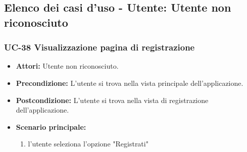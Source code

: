 \subsection{Elenco dei casi d'uso - Utente: Utente non riconosciuto}

\subsubsection{UC-38 Visualizzazione pagina di registrazione}
	\begin{itemize}
		\item \textbf{Attori:} Utente non riconosciuto.
		\item \textbf{Precondizione:} L'utente si trova nella vista principale dell'applicazione.
		\item \textbf{Postcondizione:} L'utente si trova nella vista di registrazione dell'applicazione.
		\item \textbf{Scenario principale:}
		\begin{enumerate}
			\item l'utente seleziona l'opzione "Registrati"
		\end{enumerate}
	\end{itemize}



